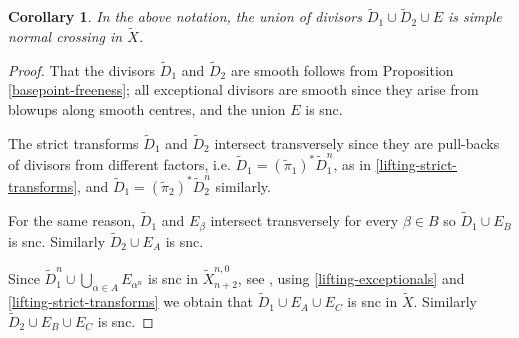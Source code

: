 \documentclass[a4paper,11pt]{article}
\newtheorem{corollary}[theorem]{Corollary}
\begin{document}
\begin{corollary}
In the above notation, the union of divisors 
$\widetilde{D}_1\cup \widetilde{D}_2\cup E$  is simple normal crossing in $\widetilde{X}$.
\end{corollary}
\begin{proof}
That the divisors $\widetilde{D}_1$ and $\widetilde{D}_2$ are smooth follows from Proposition \ref{basepoint-freeness}; all exceptional divisors are smooth since they arise from blowups along smooth centres, and the union $E$ is snc. 

The strict transforms $\widetilde{D}_1$ and $\widetilde{D}_2$ intersect transversely since they are pull-backs of divisors from different factors, i.e. $\widetilde{D}_1=(\tilde{\pi}_1)^\ast \widetilde{D}^n_1$, as in \eqref{lifting-strict-transforms}, and $\widetilde{D}_1=(\tilde{\pi}_2)^\ast \widetilde{D}^n_2$ similarly.

For the same reason, $\widetilde{D}_1$ and $E_\beta$ intersect transversely for every $\beta \in B$ so $\widetilde{D}_1\cup E_B$ is snc. Similarly $\widetilde{D}_2\cup E_A$ is snc.

Since $\widetilde{D}^n_1 \cup \bigcup_{\alpha \in A} E_{\alpha^n}$ is snc in $\widetilde{X}^{n,0}_{n+2}$, see \cite[Corollary 2.10]{DP19}, using \eqref{lifting-exceptionals} and \eqref{lifting-strict-transforms} we obtain that $\widetilde{D}_1\cup E_A\cup E_C$ is snc in $\widetilde{X}$. Similarly $\widetilde{D}_2\cup E_B\cup E_C$ is snc.
\end{proof}
\end{document}
